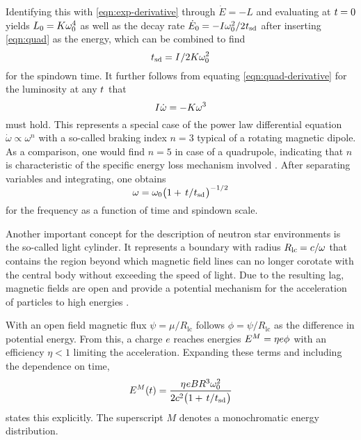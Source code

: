 \newpage

Identifying this with \eqref{eqn:exp-derivative} through $\dot{E} = -L$ and evaluating at $t \kern-0.3pt= 0$ yields
$L_0 \kern-0.3pt = \kern-0.2pt K \omega_0^4$ as well as the decay rate $\dot{E}_0 \kern-0.3pt = -I \omega_0^2 / 2 \kern+0.4pt t_\text{sd}$
after inserting \eqref{eqn:quad} as the energy, which can be combined to find
\begin{equation*}
	t_\text{sd} = I \kern+0.5pt / 2K\omega_0^2
	\label{eqn:spindown-time}
\end{equation*}
for the spindown time. It further follows from equating \eqref{eqn:quad-derivative} for the luminosity at any $t \kern+0.5pt$ that
\begin{equation*}
	I \kern+0.5pt \dot{\omega} = -K \omega^3
\end{equation*}
must hold. This represents a special case of the power law differential equation $\dot{\omega} \propto \omega^n$ with a so-called
braking index $n = 3$ typical of a rotating magnetic dipole. As a comparison, one would find $n = 5$ in case of a quadrupole, indicating
that $n$ is characteristic of the specific energy loss mechanism involved \cite{Alvarez_2004}. After separating variables and integrating,
one obtains
\begin{equation*}
	\omega = \omega_0 \smash{\bigl( 1 + \kern+1.5pt t \kern+0.1pt / \kern+0.2pt t_\text{sd} \kern+0.5pt \bigr)^{-1/2}}
	\label{eqn:frequency}
\end{equation*}
for the frequency as a function of time and spindown scale.

Another important concept for the description of neutron star environments is the so-called light cylinder. It represents a boundary
with radius $R_\text{lc} \kern-0.6pt = c / \kern-0.4pt \omega$ that contains the region beyond which magnetic field lines can no longer
corotate with the central body without exceeding the speed of light. Due to the resulting lag, magnetic fields are open and provide a
potential mechanism for the acceleration of particles to high energies \cite{Goldreich_1969}.

With an open field magnetic flux $\psi = \mu / R_\text{lc}$ follows $\phi = \psi / R_\text{lc}$ as the difference in potential energy.
From this, a charge $e$ reaches energies $E^M = \eta e \phi \kern+0.5pt$ with an efficiency $\eta < 1$ limiting the acceleration.
Expanding these terms and including the dependence on time,
\begin{equation}
	E^M(t) = \frac{\eta \kern+0.5pt e B R^3 \omega_0^2}{2c^2 \bigl( 1 + \kern+1.5pt t \kern+0.1pt / \kern+0.2pt t_\text{sd} \kern+0.5pt \bigr)}
	\label{eqn:mono}
\end{equation}
states this explicitly. The superscript $M$ denotes a monochromatic energy distribution.



